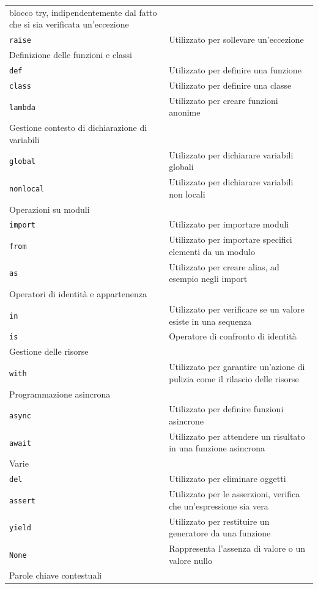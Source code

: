 \documentclass[
  letterpaper,
]{scrbook}
\begin{document}
\begin{longtable}[]{@{}
  >{\raggedright\arraybackslash}p{}
  >{\raggedright\arraybackslash}p{}@{}}
blocco try, indipendentemente dal fatto che si sia verificata
un'eccezione \\
\texttt{raise} & Utilizzato per sollevare un'eccezione \\
Definizione delle funzioni e classi & \\
\texttt{def} & Utilizzato per definire una funzione \\
\texttt{class} & Utilizzato per definire una classe \\
\texttt{lambda} & Utilizzato per creare funzioni anonime \\
Gestione contesto di dichiarazione di variabili & \\
\texttt{global} & Utilizzato per dichiarare variabili globali \\
\texttt{nonlocal} & Utilizzato per dichiarare variabili non locali \\
Operazioni su moduli & \\
\texttt{import} & Utilizzato per importare moduli \\
\texttt{from} & Utilizzato per importare specifici elementi da un
modulo \\
\texttt{as} & Utilizzato per creare alias, ad esempio negli import \\
Operatori di identità e appartenenza & \\
\texttt{in} & Utilizzato per verificare se un valore esiste in una
sequenza \\
\texttt{is} & Operatore di confronto di identità \\
Gestione delle risorse & \\
\texttt{with} & Utilizzato per garantire un'azione di pulizia come il
rilascio delle risorse \\
Programmazione asincrona & \\
\texttt{async} & Utilizzato per definire funzioni asincrone \\
\texttt{await} & Utilizzato per attendere un risultato in una funzione
asincrona \\
Varie & \\
\texttt{del} & Utilizzato per eliminare oggetti \\
\texttt{assert} & Utilizzato per le asserzioni, verifica che
un'espressione sia vera \\
\texttt{yield} & Utilizzato per restituire un generatore da una
funzione \\
\texttt{None} & Rappresenta l'assenza di valore o un valore nullo \\
Parole chiave contestuali & \\

\end{longtable}
\end{document}
